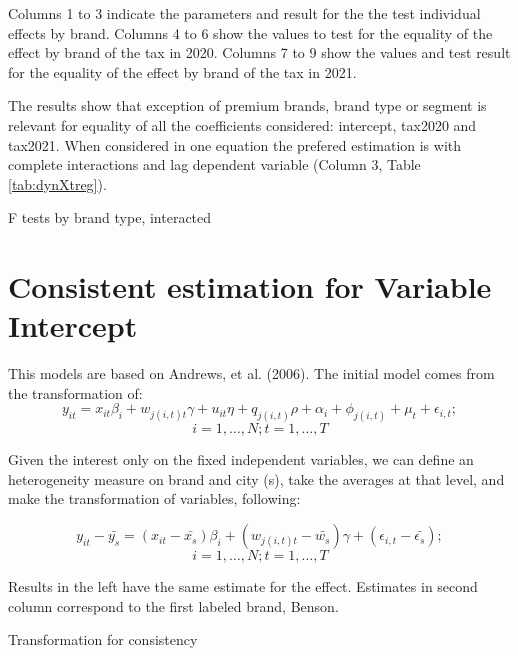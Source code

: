 \documentclass[]{article}
\begin{document}
Columns 1 to 3 indicate the parameters and result for the the test individual effects by brand. Columns 4 to 6 show the values to test for the equality of the effect by brand of the tax in 2020. Columns 7 to 9 show the values and test result for the equality of the effect by brand of the tax in 2021.
 
The results show that exception of premium brands, brand type or segment is relevant for equality of all the coefficients considered: intercept, tax2020 and tax2021. When considered in one equation the prefered estimation is with complete interactions and lag dependent variable (Column 3, Table \ref{tab:dynXtreg}).
 
\begin{landscape}
\begin{table}[ht]
	\centering
	\caption{F tests by brand type, interacted \label{tab:FtestsDyn}} 
	
\end{table}
\end{landscape}
 
\section{Consistent estimation for Variable Intercept}
This models are based on Andrews, et al. (2006). The initial model comes from the transformation of:
\begin{equation*}
	y_{it} = x_{it} \beta_{i} + w_{j(i,t)t} \gamma + u_{it} \eta + q_{j(i,t)} \rho + \alpha_{i}  + \phi_{j(i,t)} + \mu_{t} + \epsilon_{i,t}; 
\end{equation*}
$$i = 1,\ldots,N; t=1,\ldots,T$$

Given the interest only on the fixed independent variables, we can define an heterogeneity measure on brand and city (s), take the averages at that level, and make the transformation of variables, following:
 
\begin{equation*}
y_{it} - \bar{y_s} = (x_{it} - \bar{x_{s}}) \beta_{i} + (w_{j(i,t)t}-\bar{w_{s}}) \gamma + (\epsilon_{i,t} - \bar{\epsilon_{s}}); 
\end{equation*}
$$i = 1,\ldots,N; t=1,\ldots,T$$
 
Results in the left have the same estimate for the effect. Estimates in second column correspond to the first labeled brand, Benson.
 
	\begin{table}[ht]
		\centering
		\caption{Transformation for consistency \label{tab:xtDm}} 

	\end{table}
\end{document}
